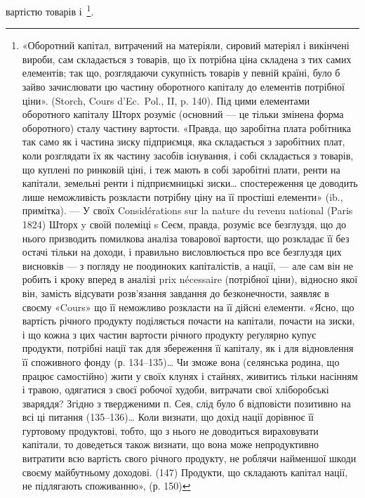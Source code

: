 вартістю товарів і~\footnote{
«Оборотний капітал, витрачений на матеріяли, сировий матеріял і викінчені вироби, сам
складається з товарів, що їх потрібна ціна складена з тих самих елементів; так що, розглядаючи
сукупність товарів у певній країні, було б зайво зачислювати цю частину оборотного капіталу до
елементів потрібної ціни». (Storch, Cours d’Ec.~Pol., II, p. 140). Під цими елементами оборотного
капіталу Шторх розуміє (основний — це тільки змінена форма оборотного) сталу частину вартости.
«Правда, що заробітна плата робітника так само як і частина зиску підприємця, яка складається з
заробітних плат, коли розглядати їх як частину засобів існування, і собі складається з товарів, що
куплені по ринковій ціні, і теж мають в собі заробітні плати, ренти на капітали, земельні ренти і
підприємницькі зиски\dots{} спостереження це доводить лише неможливість розкласти потрібну ціну на її
простіші елементи» (ib., примітка). — У своїх Considérations sur la nature du revenu national (Paris
1824)
Шторх y своїй полеміці s Сеєм, правда, розуміє все безглуздя, що до нього призводить помилкова
аналіза товарової вартости, що розкладає її без остачі тільки на доходи, і правильно висловлюється
про все безглуздя цих висновків — з погляду не поодиноких капіталістів, а нації, — але сам він не
робить і кроку вперед в аналізі prix nécessaire (потрібної ціни), відносно якої він, замість
відсувати розв’язання
завдання до безконечности, заявляє в своєму «Cours» що її неможливо розкласти на її дійсні елементи.
«Ясно, що вартість річного продукту поділяється почасти на капітали, почасти на зиски, і що кожна з
цих частин вартости річного продукту реґулярно купує продукти, потрібні нації так для збереження її
капіталу, як і для відновлення її споживного фонду (р. 134--135)\dots{} Чи зможе вона (селянська родина,
що працює самостійно) жити у своїх клунях і стайнях, живитись тільки насінням
і травою, одягатися з своєї робочої худоби, витрачати свої хліборобські зваряддя? Згідно з
твердженими п. Сея, слід було б відповісти позитивно на всі ці питання (135--136)\dots{} Коли визнати, що
дохід нації дорівнює її гуртовому продуктові, тобто, що з нього не доводиться вираховувати капітали,
то доведеться також визнати, що вона може непродуктивно витратити всю вартість свого річного
продукту,
не роблячи найменшої шкоди своєму майбутньому доходові. (147) Продукти, що складають капітал нації,
не підлягають споживанню», (р. 150)
}.

